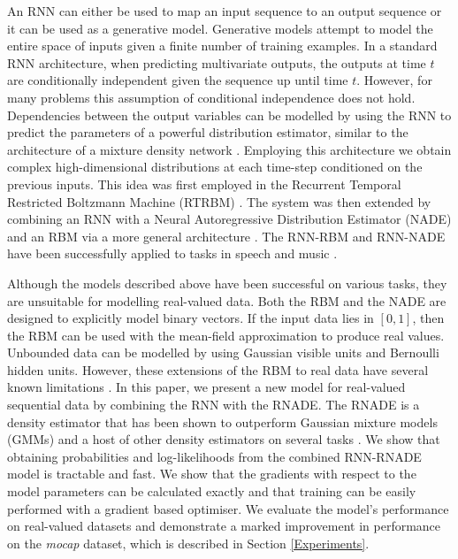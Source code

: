 \documentclass{article} %
\begin{document}
An RNN can either be used to map an input sequence to an output sequence or it can be used as a generative model. Generative models attempt to model the entire space of inputs given a finite number of training examples. In a standard RNN architecture, when predicting multivariate outputs, the outputs at time $t$ are conditionally independent given the sequence up until time $t$. However, for many problems this assumption of conditional independence does not hold. Dependencies between the output variables can be modelled by using the RNN to predict the parameters of a powerful distribution estimator, similar to the architecture of a mixture density network \cite{bishop1994mixture}. Employing this architecture we obtain complex high-dimensional distributions at each time-step conditioned on the previous inputs. This idea was first employed in the Recurrent Temporal Restricted Boltzmann Machine (RTRBM) \cite{Sutskever2008}. The system was then extended by combining an RNN with a Neural Autoregressive Distribution Estimator (NADE) and an RBM via a more general architecture \cite{Boulanger-Lewandowski2012}. The RNN-RBM and RNN-NADE have been successfully applied to tasks in speech and music \cite{boulangerphone,Boulanger-Lewandowski2012}. 

Although the models described above have been successful on various tasks, they are unsuitable for modelling real-valued data. Both the RBM and the NADE are designed to explicitly model binary vectors. If the input data lies in $[0,1]$, then the RBM can be used with the mean-field approximation to produce real values. Unbounded data can be modelled by using Gaussian visible units and Bernoulli hidden units. However, these extensions of the RBM to real data have several known limitations \cite{theis2011all}. In this paper, we present a new model for real-valued sequential data by combining the RNN with the RNADE. The RNADE is a density estimator that has been shown to outperform Gaussian mixture models (GMMs) and a host of other density estimators on several tasks \cite{Uria2013}. We show that obtaining probabilities and log-likelihoods from the combined RNN-RNADE model is tractable and fast. We show that the gradients with respect to the model parameters can be calculated exactly and that training can be easily performed with a gradient based optimiser. We evaluate the model's performance on real-valued datasets and demonstrate a marked improvement in performance on the {\it \textit{mocap}} dataset, which is described in Section \ref{Experiments}. 
 
\end{document}
